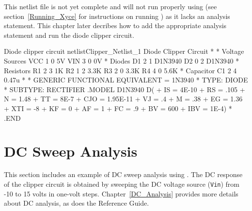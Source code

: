 This netlist file is not yet complete and will not run properly using \Xyce{}
(see section~\ref{Running_Xyce} for instructions on running \Xyce{}) as 
it lacks an analysis statement.  This chapter later decribes how to add the appropriate analysis statement and run the diode clipper circuit.

\begin{NetlistFigure}{Diode clipper circuit netlist}{Clipper_Netlist_1}
Diode Clipper Circuit
*
* Voltage Sources
VCC 1 0 5V
VIN 3 0 0V
* Diodes
D1 2 1 D1N3940
D2 0 2 D1N3940
* Resistors
R1 2 3 1K
R2 1 2 3.3K
R3 2 0 3.3K
R4 4 0 5.6K
* Capacitor
C1 2 4 0.47u
*
* GENERIC FUNCTIONAL EQUIVALENT = 1N3940
* TYPE:  DIODE
* SUBTYPE:  RECTIFIER
.MODEL D1N3940 D(
+         IS = 4E-10
+         RS = .105
+          N = 1.48
+         TT = 8E-7
+        CJO = 1.95E-11
+         VJ = .4
+          M = .38
+         EG = 1.36
+        XTI = -8
+         KF = 0
+         AF = 1
+         FC = .9
+         BV = 600
+        IBV = 1E-4)
*
.END
\end{NetlistFigure}

\section{DC Sweep Analysis}
\label{DC_Sweep}
This section includes an example of DC sweep
 analysis using \Xyce{}.  
The DC response of the clipper circuit is obtained by sweeping the DC voltage 
source (\texttt{Vin}) from -10 to 15 volts in one-volt steps.
Chapter~\ref{DC_Analysis} provides more details about DC analysis,  
as does the \Xyce{} Reference 
Guide\ReferenceGuide{}.


